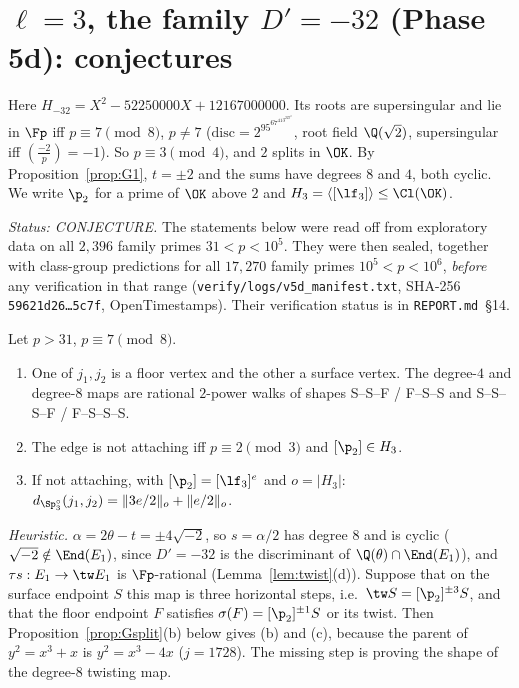 \section{\texorpdfstring{$\ell=3$}{l=3}, the family \texorpdfstring{$D'=-32$}{D'=-32} (Phase 5d): conjectures}\label{sec:l3m32}

Here $H_{-32}=X^2-52250000X+12167000000$.  Its roots are supersingular and lie in $\Fp$ iff $p\equiv7\pmod8$, $p\neq7$
\tagX{} ($\mathrm{disc}=2^95^67^413^229^2$, root field $\Q(\sqrt2)$, supersingular iff $(\frac{-2}p)=-1$).  So $p\equiv3\pmod4$, and
$2$ splits in $\OK$.  By Proposition~\ref{prop:G1}, $t=\pm2$ and the sums have degrees $8$ and $4$, both cyclic.
We write $\p_2$ for a prime of $\OK$ above $2$ and $H_3=\langle[\lf_3]\rangle\le\Cl(\OK)$.

\emph{Status: CONJECTURE.}  The statements below were read off from exploratory data on all $2{,}396$ family primes
$31<p<10^5$.  They were then sealed, together with class-group predictions for all $17{,}270$ family primes
$10^5<p<10^6$, \emph{before} any verification in that range (\texttt{verify/logs/v5d\_manifest.txt}, SHA-256
\texttt{59621d26\ldots5c7f}, OpenTimestamps).  Their verification status is in \texttt{REPORT.md}~\S14.

\begin{conjecture}[L$_{32}$, A$_{32}$, C$_{32}$]\label{conj:32}
Let $p>31$, $p\equiv7\pmod8$.
\begin{enumerate}[label=(\alph*)]
\item One of $j_1,j_2$ is a floor vertex and the other a surface vertex.  The degree-$4$ and degree-$8$ maps are rational
  $2$-power walks of shapes S--S--F / F--S--S and S--S--S--F / F--S--S--S.
\item The edge is not attaching iff $p\equiv2\pmod3$ and $[\p_2]\in H_3$.
\item If not attaching, with $[\p_2]=[\lf_3]^e$ and $o=|H_3|$: $d_{\Sp^\circ_3}(j_1,j_2)=\|3e/2\|_o+\|e/2\|_o$.
\end{enumerate}
\end{conjecture}
\noindent\emph{Heuristic.}  $\alpha=2\theta-t=\pm4\sqrt{-2}$, so $s=\alpha/2$ has degree $8$ and is cyclic
($\sqrt{-2}\notin\End(E_1)$, since $D'=-32$ is the discriminant of $\Q(\theta)\cap\End(E_1)$), and $\tau s:E_1\to\tw E_1$ is
$\Fp$-rational (Lemma~\ref{lem:twist}(d)).  Suppose that on the surface endpoint $S$ this map is three horizontal steps, i.e.\
$\tw S=[\p_2]^{\pm3}S$, and that the floor endpoint $F$ satisfies $\sigma(F)=[\p_2]^{\pm1}S$ or its twist.  Then
Proposition~\ref{prop:Gsplit}(b) below gives (b) and (c), because the parent of $y^2=x^3+x$ is $y^2=x^3-4x$ ($j=1728$).  The
missing step is proving the shape of the degree-$8$ twisting map.

